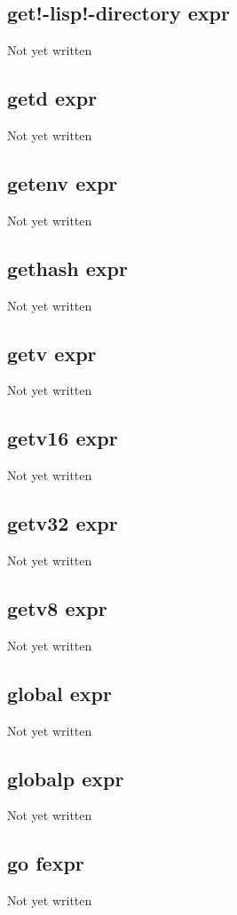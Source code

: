 \documentclass[a4paper,11pt]{article}
\begin{document}
{\subsection{\ttfamily get!-lisp!-directory expr}
Not yet written

\subsection{\ttfamily getd expr}
Not yet written

\subsection{\ttfamily getenv expr}
Not yet written

\subsection{\ttfamily gethash expr}
Not yet written

\subsection{\ttfamily getv expr}
Not yet written

\subsection{\ttfamily getv16 expr}
Not yet written

\subsection{\ttfamily getv32 expr}
Not yet written

\subsection{\ttfamily getv8 expr}
Not yet written

\subsection{\ttfamily global expr}
Not yet written

\subsection{\ttfamily globalp expr}
Not yet written

\subsection{\ttfamily go fexpr}
Not yet written

}
\end{document}
